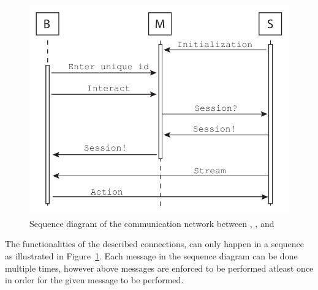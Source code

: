 \begin{figure}[!h]
    \centering 
    \includegraphics[width=\textwidth]{gfx/sequence_diagram.pdf}
    \caption{Sequence diagram of the communication network between , , and }
    \label{fig:sequence_diagram}
\end{figure}


The functionalities of the described connections, can only happen in a sequence as illustrated in Figure~\ref{fig:sequence_diagram}.
Each message in the sequence diagram can be done multiple times, however above messages are enforced to be performed atleast once in order for the given message to be performed. \\



